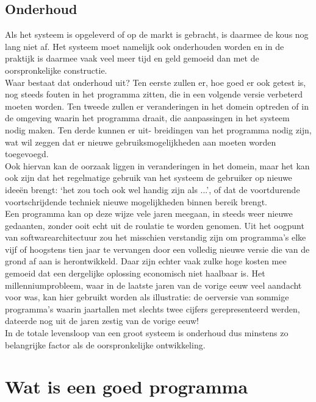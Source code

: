 \documentclass{article}
\begin{document}
	\subsection{Onderhoud}
	
	Als het systeem is opgeleverd of op de markt is gebracht, is daarmee
	de kous nog lang niet af. Het systeem moet namelijk ook onderhouden
	worden en in de praktijk is daarmee vaak veel meer tijd en geld gemoeid
	dan met de oorspronkelijke constructie. \\
	Waar bestaat dat onderhoud uit? Ten eerste zullen er, hoe goed er ook
	getest is, nog steeds fouten in het programma zitten, die in een volgende
	versie verbeterd moeten worden. Ten tweede zullen er veranderingen in
	het domein optreden of in de omgeving waarin het programma draait,
	die aanpassingen in het systeem nodig maken. Ten derde kunnen er uit-
	breidingen van het programma nodig zijn, wat wil zeggen dat er nieuwe
	gebruiksmogelijkheden aan moeten worden toegevoegd. \\
	Ook hiervan kan de oorzaak liggen in veranderingen in het domein,
	maar het kan ook zijn dat het regelmatige gebruik van het systeem de
	gebruiker op nieuwe ideeën brengt: ‘het zou toch ook wel handig zijn
	als ...’, of dat de voortdurende voortschrijdende techniek nieuwe
	mogelijkheden binnen bereik brengt. \\
	\newpage
	Een programma kan op deze wijze vele jaren meegaan, in steeds weer
	nieuwe gedaanten, zonder ooit echt uit de roulatie te worden genomen.
	Uit het oogpunt van softwarearchitectuur zou het misschien verstandig
	zijn om programma’s elke vijf of hoogstens tien jaar te vervangen door
	een volledig nieuwe versie die van de grond af aan is herontwikkeld.
	Daar zijn echter vaak zulke hoge kosten mee gemoeid dat een dergelijke
	oplossing economisch niet haalbaar is. Het millenniumprobleem, waar
	in de laatste jaren van de vorige eeuw veel aandacht voor was, kan hier
	gebruikt worden als illustratie: de oerversie van sommige programma’s
	waarin jaartallen met slechts twee cijfers gerepresenteerd werden,
	dateerde nog uit de jaren zestig van de vorige eeuw! \\
	In de totale levensloop van een groot systeem is onderhoud dus
	minstens zo belangrijke factor als de oorspronkelijke ontwikkeling. \\
	\newpage
	\section{Wat is een goed programma}
	
\end{document}
